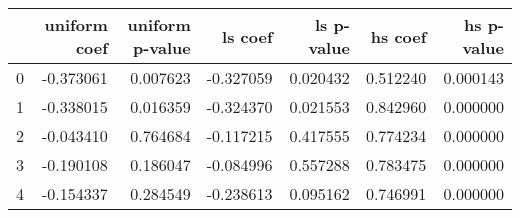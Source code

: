 \begin{tabular}{lrrrrrr}
\toprule
 & uniform coef & uniform p-value & ls coef & ls p-value & hs coef & hs p-value \\
\midrule
0 & -0.373061 & 0.007623 & -0.327059 & 0.020432 & 0.512240 & 0.000143 \\
1 & -0.338015 & 0.016359 & -0.324370 & 0.021553 & 0.842960 & 0.000000 \\
2 & -0.043410 & 0.764684 & -0.117215 & 0.417555 & 0.774234 & 0.000000 \\
3 & -0.190108 & 0.186047 & -0.084996 & 0.557288 & 0.783475 & 0.000000 \\
4 & -0.154337 & 0.284549 & -0.238613 & 0.095162 & 0.746991 & 0.000000 \\
\bottomrule
\end{tabular}
